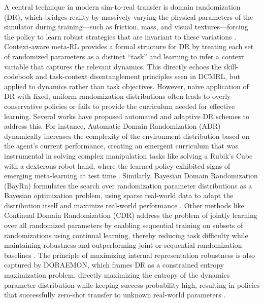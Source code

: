 \documentclass[11pt]{article}
\begin{document}
A central technique in modern sim-to-real transfer is domain randomization (DR), which bridges reality by massively varying the physical parameters of the simulator during training---such as friction, mass, and visual textures---forcing the policy to learn robust strategies that are invariant to these variations \cite{ref398}. Context-aware meta-RL provides a formal structure for DR by treating each set of randomized parameters as a distinct ``task'' and learning to infer a context variable that captures the relevant dynamics. This directly echoes the skill-codebook and task-context disentanglement principles seen in DCMRL, but applied to dynamics rather than task objectives. However, naïve application of DR with fixed, uniform randomization distributions often leads to overly conservative policies or fails to provide the curriculum needed for effective learning. Several works have proposed automated and adaptive DR schemes to address this. For instance, Automatic Domain Randomization (ADR) dynamically increases the complexity of the environment distribution based on the agent's current performance, creating an emergent curriculum that was instrumental in solving complex manipulation tasks like solving a Rubik's Cube with a dexterous robot hand, where the learned policy exhibited signs of emerging meta-learning at test time \cite{ref399}. Similarly, Bayesian Domain Randomization (BayRn) formulates the search over randomization parameter distributions as a Bayesian optimization problem, using sparse real-world data to adapt the distribution itself and maximize real-world performance \cite{ref400}. Other methods like Continual Domain Randomization (CDR) address the problem of jointly learning over all randomized parameters by enabling sequential training on subsets of randomizations using continual learning, thereby reducing task difficulty while maintaining robustness and outperforming joint or sequential randomization baselines \cite{ref401}. The principle of maximizing internal representation robustness is also captured by DORAEMON, which frames DR as a constrained entropy maximization problem, directly maximizing the entropy of the dynamics parameter distribution while keeping success probability high, resulting in policies that successfully zero-shot transfer to unknown real-world parameters \cite{ref402}.
\end{document}
